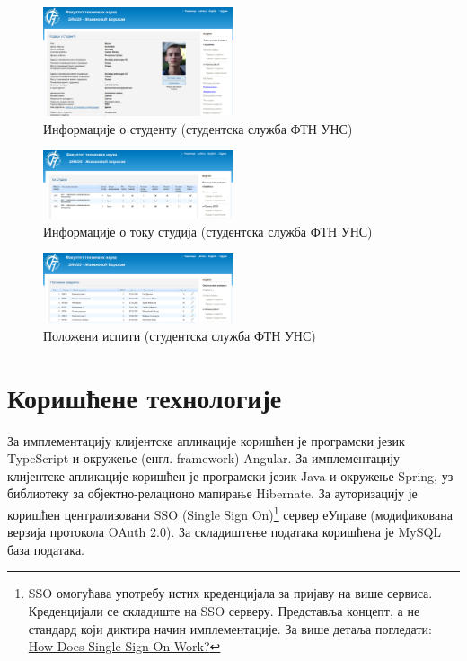 \documentclass[a4paper]{article}
\begin{document}
\begin{figure}[H]
    \centering
    \includegraphics[width=0.5\textwidth,keepaspectratio]{images/ftn1.png}
    \caption{Информације о студенту (студентска служба ФТН УНС)}
    \label{fig:ftn1}
\end{figure}

\begin{figure}[H]
    \centering
    \includegraphics[width=0.5\textwidth,keepaspectratio]{images/ftn2.png}
    \caption{Информације о току студија (студентска служба ФТН УНС)}
    \label{fig:ftn2}
\end{figure}

\begin{figure}[H]
    \centering
    \includegraphics[width=0.5\textwidth,keepaspectratio]{images/ftn3.png}
    \caption{Положени испити (студентска служба ФТН УНС)}
    \label{fig:ftn3}
\end{figure}

\section*{Коришћене технологије}

За имплементацију клијентске апликације коришћен је програмски језик TypeScript\cite{typescript} и окружење (енгл. framework) Angular\cite{angular}.
За имплементацију клијентске апликације коришћен је програмски језик Java\cite{java} и окружење Spring\cite{spring}, уз библиотеку за објектно-релационо мапирање Hibernate\cite{hibernate}.
За ауторизацију је коришћен централизовани SSO (Single Sign On)\footnote{SSO омогућава употребу истих креденцијала за пријаву на више сервиса. Креденцијали се складиште на SSO серверу. Представља концепт, а не стандард који диктира начин имплементације. За више детаља погледати: \href{https://www.onelogin.com/learn/how-single-sign-on-works}{How Does Single Sign-On Work?}}
сервер еУправе (модификована верзија протокола OAuth 2.0\cite{oauth}).
За складиштење података коришћена је MySQL\cite{mysql} база података.
\end{document}
